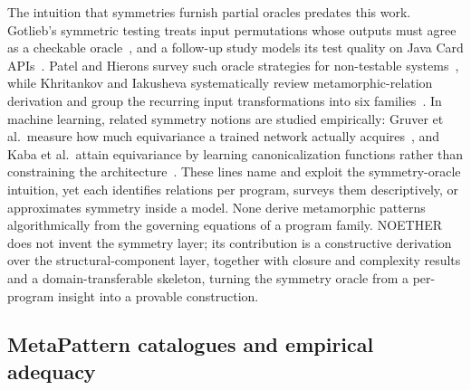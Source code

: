 \documentclass[acmsmall,screen,review]{acmart}
\begin{document}
The intuition that symmetries furnish partial oracles predates this work. Gotlieb's symmetric testing treats input permutations whose outputs must agree as a checkable oracle~\cite{Gotlieb2003Symmetries}, and a follow-up study models its test quality on Java Card APIs~\cite{GotliebBernard2006}. Patel and Hierons survey such oracle strategies for non-testable systems~\cite{PatelHierons2018}, while Khritankov and Iakusheva systematically review metamorphic-relation derivation and group the recurring input transformations into six families~\cite{KhritankovIakusheva2024}. In machine learning, related symmetry notions are studied empirically: Gruver et al.\ measure how much equivariance a trained network actually acquires~\cite{Gruver2023LieDerivative}, and Kaba et al.\ attain equivariance by learning canonicalization functions rather than constraining the architecture~\cite{Kaba2023Canonicalization}. These lines name and exploit the symmetry-oracle intuition, yet each identifies relations per program, surveys them descriptively, or approximates symmetry inside a model. None derive metamorphic patterns algorithmically from the governing equations of a program family. NOETHER does not invent the symmetry layer; its contribution is a constructive derivation over the structural-component layer, together with closure and complexity results and a domain-transferable skeleton, turning the symmetry oracle from a per-program insight into a provable construction.

\subsection{MetaPattern catalogues and empirical adequacy}
\end{document}
